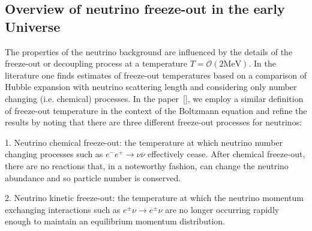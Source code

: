 \subsection{Overview of neutrino freeze-out in the early Universe}


The properties of the neutrino background are influenced by the details of the freeze-out or decoupling process at a temperature $T=\mathcal{O}(2\mathrm{MeV})$. In the literature one finds estimates of freeze-out temperatures based on a comparison of Hubble expansion with neutrino scattering length and considering only number changing (i.e. chemical) processes. In the paper~[\cite{Birrell:2014uka}], we employ a similar definition of freeze-out temperature in the context of the Boltzmann equation and refine the results by noting that there are three different freeze-out processes for neutrinos:


1. Neutrino chemical freeze-out: the temperature at which neutrino number changing processes such as $e^-e^+\to\nu\overline\nu$ effectively cease. After chemical freeze-out, there are no reactions that, in a noteworthy fashion, can
change the neutrino abundance and so particle number is conserved. %

2. Neutrino kinetic freeze-out: the temperature at which the neutrino momentum exchanging interactions such as $e^\pm\nu\to e^\pm\nu$ are no longer occurring rapidly enough to maintain an equilibrium momentum distribution. %

